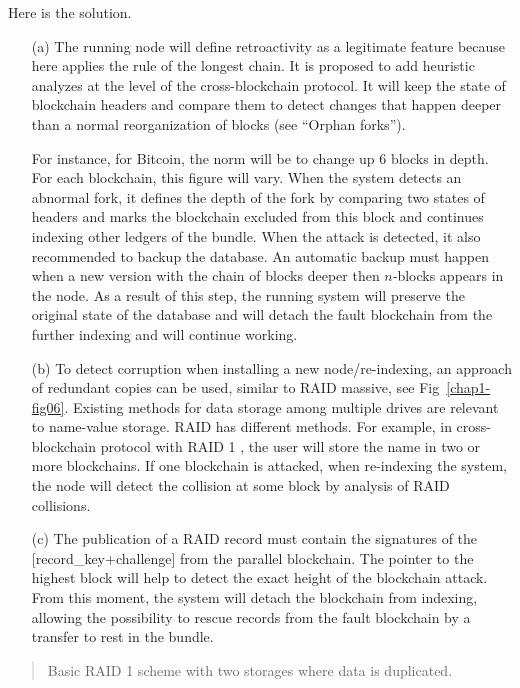 \begin{multicols}{2}
Here is the solution.
\begin{itemize}
\item[(a)] The running node will define retroactivity as a legitimate feature because here applies the rule of the longest chain. It is proposed to add heuristic analyzes at the level of the cross-blockchain protocol. It will keep the state of blockchain headers and compare them to detect changes that happen deeper than a normal reorganization of blocks (see “Orphan forks”).

For instance, for Bitcoin, the norm will be to change up 6 blocks in depth. For each blockchain, this figure will vary. When the system detects an abnormal fork, it defines the depth of the fork by comparing two states of headers and marks the blockchain excluded from this block and continues indexing other ledgers of the bundle. When the attack is detected, it also recommended to backup the database. An automatic backup must happen when a new version with the chain of blocks deeper then $n$‑blocks appears in the node. As a result of this step, the running system will preserve the original state of the database and will detach the fault blockchain from the further indexing and will continue working.

\item[(b)] To detect corruption when installing a new node/re-indexing, an approach of redundant copies can be used, similar to RAID massive, see Fig~\ref{chap1-fig06}. Existing methods for data storage among multiple drives are relevant to name-value storage. RAID has different methods. For example, in cross-blockchain protocol with RAID 1 \cite{art1-key41}, the user will store the name in two or more blockchains. If one blockchain is attacked, when re-indexing the system, the node will detect the collision at some block by analysis of RAID collisions.

\item[(c)] The publication of a RAID record must contain the signatures of the [record\_key+challenge] from the parallel blockchain. The pointer to the highest block will help to detect the exact height of the blockchain attack. From this moment, the system will detach the blockchain from indexing, allowing the possibility to rescue records from the fault blockchain by a transfer to rest in the bundle.
\end{itemize}
\begin{quote}
Basic RAID 1 scheme with two storages where data is duplicated.
\end{quote}


\end{multicols}
